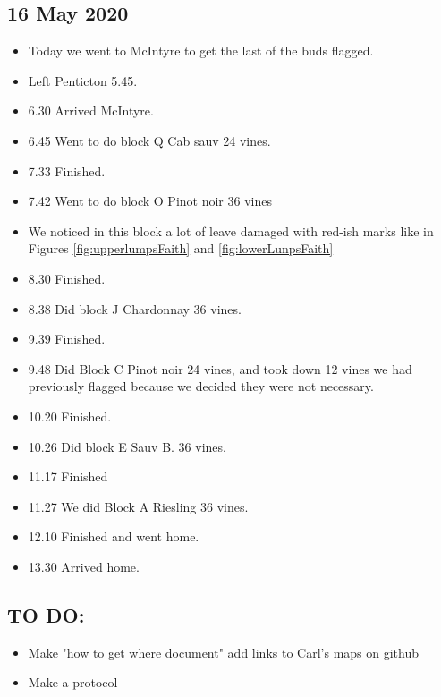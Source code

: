 \documentclass[11pt,letter]{article}
\newenvironment{smitemize}{
\begin{itemize}
  \setlength{\itemsep}{0pt}
  \setlength{\parskip}{0.8pt}
  \setlength{\parsep}{0pt}}
{\end{itemize}
}
\begin{document}
\subsection {16 May 2020}
\begin{smitemize}
\item Today we went to McIntyre to get the last of the buds flagged. 
\item Left Penticton 5.45.
\item 6.30 Arrived McIntyre.
\item 6.45 Went to do block Q Cab sauv 24 vines.
\item 7.33 Finished. 
\item 7.42 Went to do block O Pinot noir 36 vines
\item We noticed in this block a lot of leave damaged with red-ish marks like in Figures \ref{fig:upperlumpsFaith} and \ref{fig:lowerLunpsFaith}
\item 8.30 Finished.
\item 8.38 Did block J Chardonnay 36 vines. 
\item 9.39 Finished.
\item 9.48 Did Block C Pinot noir 24 vines, and took down 12 vines we had previously flagged because we decided they were not necessary.
\item 10.20 Finished.
\item 10.26 Did block E Sauv B. 36 vines.
\item 11.17 Finished
\item 11.27 We did Block A Riesling 36 vines. 
\item 12.10 Finished and went home.
\item 13.30 Arrived home. 
\end{smitemize}

\subsection{TO DO:}
\begin{smitemize}
\item Make "how to get where document" add links to Carl's maps on github
\item Make a protocol 

\end{smitemize}
\end{document}
